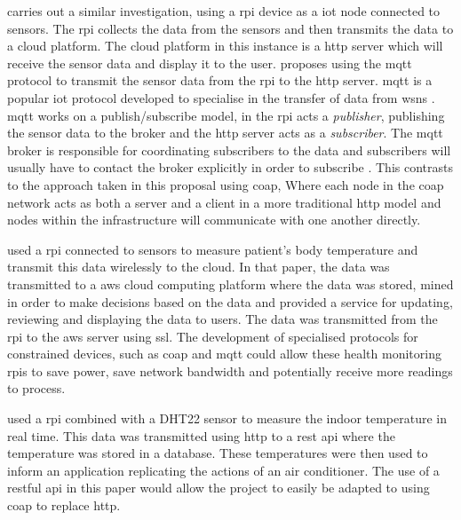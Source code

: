\cite{rode_iot_2017} carries out a similar investigation, using a \gls{rpi} 
device as a \gls{iot} node connected to sensors. The \gls{rpi} collects the 
data from the sensors and then transmits the data to a cloud platform. The 
cloud platform in this instance is a \gls{http} server which will receive the
sensor data and display it to the user. \cite{rode_iot_2017} proposes using the 
\gls{mqtt} protocol to transmit the sensor data from the \gls{rpi} to the
\gls{http} server.
\gls{mqtt} is a popular \gls{iot} protocol developed to specialise in the transfer
of data from \glspl{wsn} \citep{hunkeler_mqtt-s_2008}. \gls{mqtt} works on a 
publish/subscribe model, in \cite{rode_iot_2017} the \gls{rpi} acts a \textit{publisher}, 
publishing the sensor data to the broker and the \gls{http} server acts as a
\textit{subscriber}. The \gls{mqtt} broker is responsible for coordinating subscribers 
to the data and subscribers will usually have to contact the broker explicitly in 
order to subscribe \citep{hunkeler_mqtt-s_2008}.
This contrasts to the approach taken in this proposal using \gls{coap}, Where each
node in the \gls{coap} network acts as both a server and a client in a more traditional
\gls{http} model and nodes within the infrastructure will communicate with one
another directly.

\cite{jassas_smart_2015} used a \gls{rpi} connected to sensors to measure 
patient's body temperature and transmit this data wirelessly to the cloud.
In that paper, the data was transmitted to a \gls{aws} cloud computing platform
where the data was stored, mined in order to make decisions based on the data 
and provided a service for updating, reviewing and displaying the data to users.
The data was transmitted from the \gls{rpi} to the \gls{aws} server using \gls{ssl}.
The development of specialised protocols for constrained devices, such as \gls{coap}
and \gls{mqtt} could allow these health monitoring \glspl{rpi} to save power,
save network bandwidth and potentially receive more readings to process.

\cite{lee_internet_2018} used a \gls{rpi} combined with a DHT22 sensor to measure
the indoor temperature in real time. This data was transmitted using \gls{http}
to a \gls{rest} \gls{api} where the temperature was stored in a database.
These temperatures were then used to inform an application replicating 
the actions of an air conditioner. The use of a \gls{rest}ful \gls{api} in 
this paper would allow the project to easily be adapted to using \gls{coap} 
to replace \gls{http}.